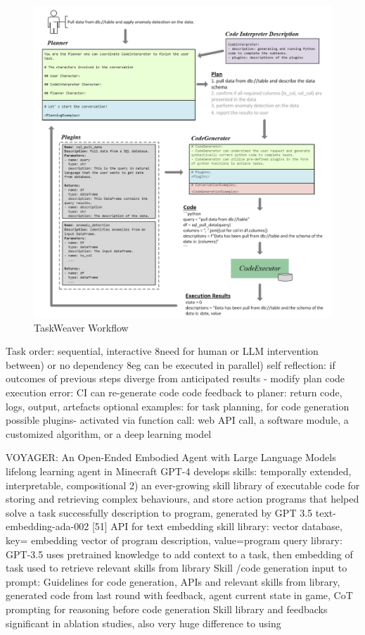 \documentclass{article}
\begin{document}
\begin{figure}[h]
	\centering
	\includegraphics[width=1.0\linewidth]{TaskWeaverWorkflow.png}
	\caption{TaskWeaver Workflow \cite{qiao_taskweaver_2023}}
	\label{fig:TaskWeaverWorkflow}
\end{figure}
Task order: sequential, interactive 8need for human or LLM intervention between) or no dependency 8eg can be executed in parallel)
self reflection: if outcomes of previous steps diverge from anticipated results - modify plan
code execution error: CI can re-generate code
code feedback to planer: return code, logs, output, artefacts
optional examples: for task planning, for code generation
possible plugins- activated via function call: web API call, a software module, a customized algorithm, or a deep learning model

\cite{wang_voyager_2023} VOYAGER: An Open-Ended Embodied Agent with Large Language Models
lifelong learning agent in Minecraft
GPT-4
develops skills: temporally extended, interpretable, compositional
2) an ever-growing skill library of executable code for storing and retrieving complex behaviours, and 
store action programs that helped solve a task successfully
description to program, generated by GPT 3.5
text-embedding-ada-002 [51] API for text embedding
skill library: vector database, key= embedding vector of program description, value=program
query library: GPT-3.5 uses pretrained knowledge to add context to a task, then embedding of task used to retrieve relevant skills from library
Skill /code generation input to prompt: Guidelines for code generation, APIs and relevant skills from library, generated code from last round with feedback, agent current state in game, CoT prompting for reasoning before code generation
Skill library and feedbacks significant in ablation studies, also very huge difference to using
\end{document}
